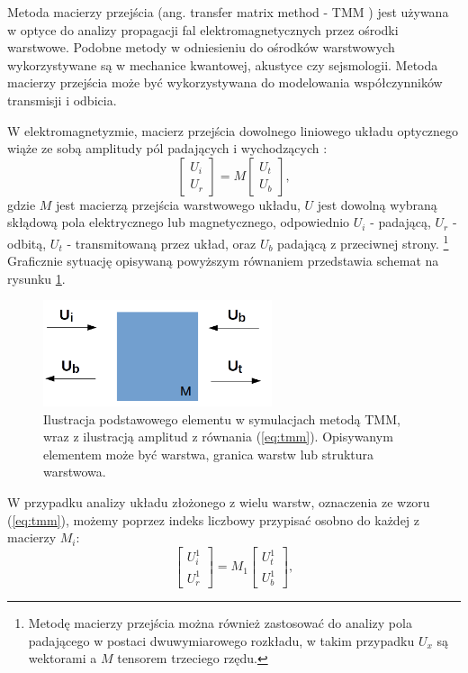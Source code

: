 \label{subart:tmm}
Metoda macierzy przejścia  (ang. transfer matrix method - TMM ) jest używana w optyce do analizy propagacji fal elektromagnetycznych przez ośrodki warstwowe. Podobne metody w odniesieniu do ośrodków warstwowych wykorzystywane są w mechanice kwantowej, akustyce czy sejsmologii. Metoda macierzy przejścia może być wykorzystywana do modelowania współczynników transmisji i odbicia.

W elektromagnetyzmie, macierz przejścia dowolnego liniowego układu optycznego wiąże ze sobą amplitudy pól padających i wychodzących \cite{teich1991fundamentals,markos2008wave}:
\begin{equation}
\begin{bmatrix}
U_i \\ 
U_r
\end{bmatrix}
= M 
\begin{bmatrix}
U_t \\
U_b
\end{bmatrix},
\label{eq:tmm}
\end{equation}
gdzie $M$ jest macierzą przejścia warstwowego układu, $U$ jest dowolną wybraną skłądową pola elektrycznego lub magnetycznego, odpowiednio $U_i$ - padającą, $U_r$ - odbitą, $U_t$ - transmitowaną przez układ, oraz $U_b$ padającą  z przeciwnej strony. \footnote{Metodę macierzy przejścia można również zastosować do analizy pola padającego w postaci dwuwymiarowego rozkładu, w takim przypadku $U_x$ są wektorami a $M$ tensorem trzeciego rzędu.} Graficznie sytuację opisywaną powyższym równaniem przedstawia schemat na rysunku \ref{fig:tmm-simple}.

\begin{figure}
	\includegraphics[width=0.6\textwidth]{images/tmm.png}
	\caption{Ilustracja podstawowego elementu w symulacjach metodą TMM, wraz z ilustracją amplitud z równania (\ref{eq:tmm}). Opisywanym elementem może być warstwa, granica warstw lub struktura warstwowa. }
	\label{fig:tmm-simple}
\end{figure}

W przypadku analizy układu złożonego z wielu warstw, oznaczenia ze wzoru (\ref{eq:tmm}), możemy poprzez indeks liczbowy przypisać osobno do każdej z macierzy $M_i$:
\begin{equation}
\begin{bmatrix}
U_i^1 \\ 
U_r^1
\end{bmatrix}
= M_1 
\begin{bmatrix}
U_t^1 \\
U_b^1
\end{bmatrix},
\label{eq:tmm-1l}
\end{equation}

